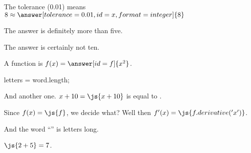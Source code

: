 \documentclass{ximera}
\begin{document}
\begin{problem}
  The tolerance (0.01) means $8 \approx \answer[tolerance=0.01,id=x,format=integer]{8}$
  
  \begin{feedback}
    The answer is definitely more than five.
  \end{feedback}

  \begin{feedback}[x==10]
    The answer is certainly not ten.
  \end{feedback}

  A function is $f(x) = \answer[id=f]{x^2}$.
\end{problem}

\begin{javascript}
  letters = word.length;
\end{javascript}

And another one.  $x + 10 = \js{x+10}$ is equal to .

Since $f(x) = \js{f}$, we decide what?  Well then $f'(x) = \js{f.derivative('x')}$.

And the word ``'' is  letters long.

$\js{2+5} = 7$.
\end{document}
